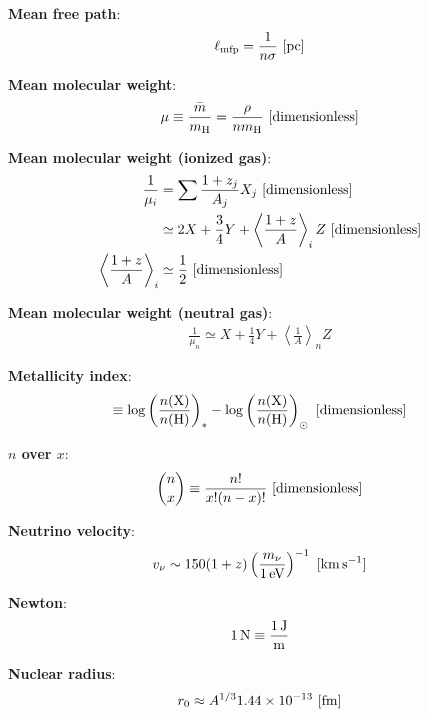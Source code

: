 \documentclass[a4paper,10pt]{article}
\begin{document}
{\noindent}\textbf{Mean free path}:
\begin{align*}
    \ell_\mathrm{mfp} = \dfrac{1}{n\sigma} ~ [{\rm pc}]
\end{align*}

{\noindent}\textbf{Mean molecular weight}:
\begin{align*}
    \mu \equiv \frac{\bar{m}}{m_{\rm H}} = \frac{\rho}{nm_{\rm H}} ~ [{\rm dimensionless}]
\end{align*}

{\noindent}\textbf{Mean molecular weight (ionized gas)}:
\begin{align*}
    \frac{1}{\mu_i} &= \sum \frac{1+z_j}{A_j} X_j ~ [{\rm dimensionless}] \\
    &\simeq 2X + \frac{3}{4}Y + \left\langle\frac{1+z}{A}\right\rangle_i Z ~ [{\rm dimensionless}] \\
    \left\langle\frac{1+z}{A}\right\rangle_i &\simeq \frac{1}{2} ~ [{\rm dimensionless}]
\end{align*}

{\noindent}\textbf{Mean molecular weight (neutral gas)}:
\begin{align*}
    \frac{1}{\mu_n} \simeq X + \frac{1}{4}Y + \left\langle\frac{1}{A}\right\rangle_n Z
\end{align*}

{\noindent}\textbf{Metallicity index}:
\begin{align*}
    [\mathrm{X}/\mathrm{H}] \equiv \log\left(\frac{n(\mathrm{X})}{n(\mathrm{H})}\right)_* -\log\left(\frac{n(\mathrm{X})}{n(\mathrm{H})}\right)_\odot ~ [{\rm dimensionless}]
\end{align*}

{\noindent}\textbf{$n$ over $x$}:
\begin{align*}
    \binom{n}{x} \equiv \frac{n!}{x!(n-x)!} ~ [{\rm dimensionless}]
\end{align*}

{\noindent}\textbf{Neutrino velocity}:
\begin{align*}
    v_\nu \sim 150(1+z)\left(\frac{m_\nu}{1\,{\rm eV}}\right)^{-1} ~ [{\rm km\,s^{-1}}]
\end{align*}

{\noindent}\textbf{Newton}:
\begin{align*}
    {\rm 1\,N \equiv \frac{1\,J}{m}}
\end{align*}

{\noindent}\textbf{Nuclear radius}:
\begin{align*}
    r_0 \approx A^{1/3}1.44\times10^{-13} ~ [{\rm fm}]
\end{align*}
\end{document}
